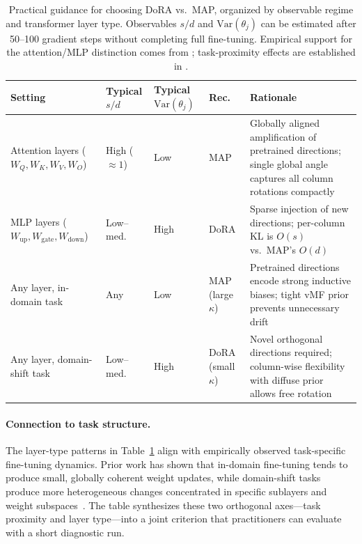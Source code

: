\documentclass[11pt]{article}
\begin{document}
\begin{table}[ht]
\centering
\caption{Practical guidance for choosing DoRA vs.\ MAP, organized by
  observable regime and transformer layer type.
  Observables $s/d$ and $\mathrm{Var}(\theta_j)$ can be estimated after
  50--100 gradient steps without completing full fine-tuning.
  Empirical support for the attention/MLP distinction comes from
  \cite{tanwar2025domain}; task-proximity effects are established
  in \cite{vu2020exploring,yang2024unveiling}.}
\label{tab:guidance}
\renewcommand{\arraystretch}{1.4}
\setlength{\tabcolsep}{5pt}
\begin{tabular}{p{3.2cm}p{1.5cm}p{2.0cm}p{1.8cm}p{4.5cm}}
\toprule
\textbf{Setting} & \textbf{Typical $s/d$} &
  \textbf{Typical $\mathrm{Var}(\theta_j)$} &
  \textbf{Rec.} & \textbf{Rationale} \\
\midrule
Attention layers \newline ($W_Q, W_K, W_V, W_O$) &
  High (${\approx}1$) & Low &
  MAP & Globally aligned amplification of pretrained directions;
        single global angle captures all column rotations compactly \\
\addlinespace
MLP layers \newline ($W_{\mathrm{up}}, W_{\mathrm{gate}}, W_{\mathrm{down}}$) &
  Low--med. & High &
  DoRA & Sparse injection of new directions; per-column KL is
         $O(s)$ vs.\ MAP's $O(d)$ \\
\addlinespace
Any layer, \newline in-domain task &
  Any & Low &
  MAP \newline (large $\kappa$) & Pretrained directions encode strong
    inductive biases; tight vMF prior prevents unnecessary drift \\
\addlinespace
Any layer, \newline domain-shift task &
  Low--med. & High &
  DoRA \newline (small $\kappa$) & Novel orthogonal directions required;
    column-wise flexibility with diffuse prior allows free rotation \\
\bottomrule
\end{tabular}
\end{table}

\paragraph{Connection to task structure.}
The layer-type patterns in Table~\ref{tab:guidance} align with
empirically observed task-specific fine-tuning dynamics.
Prior work has shown that in-domain fine-tuning tends to produce small,
globally coherent weight updates, while domain-shift tasks produce more
heterogeneous changes concentrated in specific sublayers and weight
subspaces~\cite{vu2020exploring,yang2024unveiling}.
The table synthesizes these two orthogonal axes---task proximity and
layer type---into a joint criterion that practitioners can evaluate
with a short diagnostic run.
\end{document}

